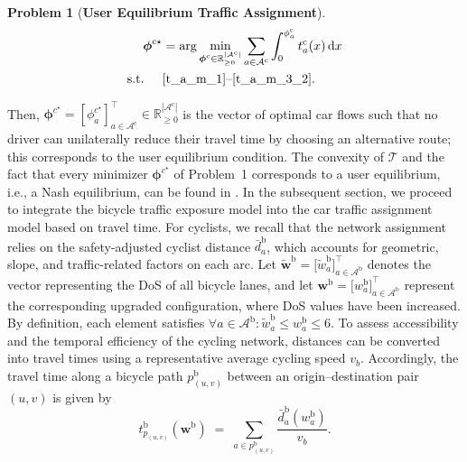 \documentclass[lettersize,journal]{IEEEtran}
\newtheorem{problem}{\textbf{Problem}}
\begin{document}
\begin{problem}[\textbf{User Equilibrium Traffic Assignment}]
\label{UE_tp}
\begin{align*}
\boldsymbol{\phi}^{\mathrm{c}\star}
&=
\arg\min_{\boldsymbol{\phi}^\mathrm{c} \in \mathbb{R}_{\geq 0}^{|\mathcal{A}^\mathrm{c}|}}
\sum_{a \in \mathcal{A}^\mathrm{c}}
\int_{0}^{\phi_{a}^\mathrm{c}} t_a^\mathrm{c}(x) \, \mathrm{d}x  \\
\text{s.t. } \quad
& \text{\eqref{t_a_m_1}--\eqref{t_a_m_3_2}}.
\end{align*}
\end{problem}
Then, $\mathbf{\phi}^{c^{\star}} = \left [\phi^{c^{\star}}_{a} \right ]_{a \in \mathcal{A}^\mathrm{c}}^\top \in \mathbb{R}_{\geq 0}^{|\mathcal{A}^\mathrm{c}|}$ is the vector of optimal car flows such that no driver can unilaterally reduce their travel time by choosing an alternative route; this corresponds to the user equilibrium condition. The convexity of $\mathcal{T}$ and the fact that every minimizer $\boldsymbol{\phi}^{c^{\star}}$ of Problem~1 corresponds to a user equilibrium, i.e., a Nash equilibrium, can be found in \cite{beckmann1956studies}. In the subsequent section, we proceed to integrate the bicycle traffic exposure model into the car traffic assignment model based on travel time.
For cyclists, we recall that the network assignment relies on the
safety-adjusted cyclist distance $\bar{d}_a^\mathrm{b}$, which accounts for geometric,
slope, and traffic-related factors on each arc. Let $\tilde{\boldsymbol{w}}^\mathrm{b} = \big[\tilde{w}_{a}^\mathrm{b}\big]_{a \in \mathcal{A}^\mathrm{b}}^\top$ denotes the vector representing the DoS of all bicycle lanes, and let $\boldsymbol{w}^\mathrm{b} = \big[w_{a}^\mathrm{b}\big]_{a \in \mathcal{A}^\mathrm{b}}^\top$ represent the corresponding upgraded configuration, where DoS values have been increased. By definition, each element satisfies 
$\forall a \in \mathcal{A}^\mathrm{b}: \tilde{w}_{a}^\mathrm{b} \leq w_{a}^\mathrm{b} \leq 6$. 
To assess accessibility and the temporal efficiency of the cycling network, distances can be converted into travel times using a representative average cycling speed $ v_b $. Accordingly, the travel time along a bicycle path $p_{(u,v)}^\mathrm{b}$ between an
origin–destination pair $(u,v)$ is given by
\begin{equation}
\label{bike_travel_time}
    t_{p_{(u,v)}}^\mathrm{b}(\boldsymbol{w}^\mathrm{b})
    \;=\;
    \sum_{a \in p_{(u,v)}^\mathrm{b}}
    \frac{\bar{d}_a^\mathrm{b}(w_a^\mathrm{b})}{v_b}.
\end{equation}
\end{document}
